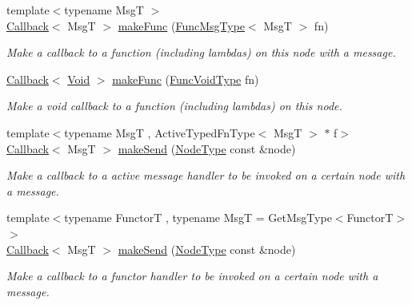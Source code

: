 \begin{DoxyCompactItemize}
{\footnotesize template$<$typename MsgT $>$ }\\\hyperlink{namespacevt_a36db99df4c973d48b1118a293fff533f}{Callback}$<$ MsgT $>$ \hyperlink{structvt_1_1pipe_1_1_pipe_manager_af51eea8377c2ee25afeaabc891b86ee2}{make\+Func} (\hyperlink{structvt_1_1pipe_1_1_pipe_manager_base_aa54eee64ab32a27777a672d49eb861f4}{Func\+Msg\+Type}$<$ MsgT $>$ fn)
\begin{DoxyCompactList}\small\item\em Make a callback to a function (including lambdas) on this node with a message. \end{DoxyCompactList}\item 
\hyperlink{namespacevt_a36db99df4c973d48b1118a293fff533f}{Callback}$<$ \hyperlink{structvt_1_1pipe_1_1_pipe_manager_ab720c2580ecfd3ab36e49aeaaff64cc6}{Void} $>$ \hyperlink{structvt_1_1pipe_1_1_pipe_manager_a073827ad7a9c387e8f0e28bc1767f641}{make\+Func} (\hyperlink{structvt_1_1pipe_1_1_pipe_manager_base_acd6f0c71f38f08d53f85e83b65406d77}{Func\+Void\+Type} fn)
\begin{DoxyCompactList}\small\item\em Make a void callback to a function (including lambdas) on this node. \end{DoxyCompactList}\item 
{\footnotesize template$<$typename MsgT , Active\+Typed\+Fn\+Type$<$ Msg\+T $>$ $\ast$ f$>$ }\\\hyperlink{namespacevt_a36db99df4c973d48b1118a293fff533f}{Callback}$<$ MsgT $>$ \hyperlink{structvt_1_1pipe_1_1_pipe_manager_a73583be6260418b13ee66e56cdade2da}{make\+Send} (\hyperlink{namespacevt_a866da9d0efc19c0a1ce79e9e492f47e2}{Node\+Type} const \&node)
\begin{DoxyCompactList}\small\item\em Make a callback to a active message handler to be invoked on a certain node with a message. \end{DoxyCompactList}\item 
{\footnotesize template$<$typename FunctorT , typename MsgT  = Get\+Msg\+Type$<$\+Functor\+T$>$$>$ }\\\hyperlink{namespacevt_a36db99df4c973d48b1118a293fff533f}{Callback}$<$ MsgT $>$ \hyperlink{structvt_1_1pipe_1_1_pipe_manager_a0fc60c66ec9c02e2c1874e08194cac44}{make\+Send} (\hyperlink{namespacevt_a866da9d0efc19c0a1ce79e9e492f47e2}{Node\+Type} const \&node)
\begin{DoxyCompactList}\small\item\em Make a callback to a functor handler to be invoked on a certain node with a message. \end{DoxyCompactList}\item 

\end{DoxyCompactItemize}
